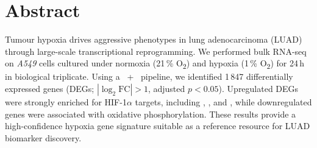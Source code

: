 \section{Abstract}

\begin{abstractbox}
Tumour hypoxia drives aggressive phenotypes in lung adenocarcinoma (LUAD) through
large-scale transcriptional reprogramming. We performed bulk RNA-seq on \textit{A549}
cells cultured under normoxia (21\,\% O\textsubscript{2}) and hypoxia (1\,\% O\textsubscript{2})
for 24\,h in biological triplicate. Using a ~+~ pipeline,
we identified 1\,847 differentially expressed genes (DEGs; $|\log_2\text{FC}|>1$,
adjusted $p<0.05$). Upregulated DEGs were strongly enriched for HIF-1$\alpha$ targets,
including , , and , while downregulated genes were
associated with oxidative phosphorylation. These results provide a high-confidence
hypoxia gene signature suitable as a reference resource for LUAD biomarker discovery.
\end{abstractbox}

\vspace{2pt}

